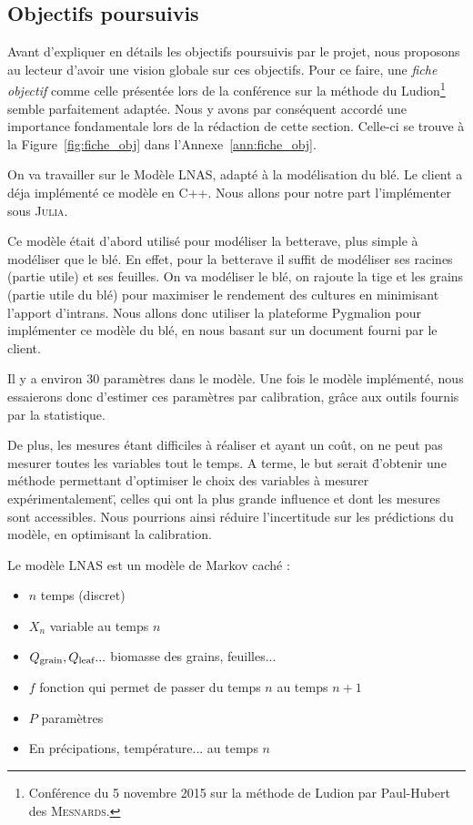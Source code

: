 \subsection{Objectifs poursuivis}
Avant d'expliquer en détails les objectifs poursuivis par le projet,
nous proposons au lecteur d'avoir une vision globale sur ces objectifs.
Pour ce faire, une \emph{fiche objectif} comme celle présentée 
lors de la conférence sur 
la méthode du Ludion\footnote{Conférence du 5 novembre 2015 
sur la méthode de Ludion par Paul-Hubert des \textsc{Mesnards}.} 
semble parfaitement adaptée.
Nous y avons par conséquent accordé une importance fondamentale
lors de la rédaction de cette section.
Celle-ci se trouve à la Figure~\ref{fig:fiche_obj} 
dans l'Annexe~\ref{ann:fiche_obj}.


On va travailler sur le Modèle LNAS, adapté à la modélisation du blé. 
Le client a déja implémenté ce modèle en C++. 
Nous allons pour notre part l'implémenter sous \textsc{Julia}.

Ce modèle était d'abord utilisé pour modéliser la betterave, 
plus simple à modéliser que le blé. 
En effet, pour la betterave il suffit de modéliser 
ses racines (partie utile) et ses feuilles.
On va modéliser le blé, on rajoute la tige et les grains (partie utile du blé)
pour maximiser le rendement des cultures en minimisant l’apport d’intrans.
Nous allons donc utiliser la plateforme Pygmalion 
pour implémenter ce modèle du blé,
en nous basant sur un document fourni par le client.

Il y a environ 30 paramètres dans le modèle. Une fois le modèle implémenté, nous essaierons donc d'estimer ces paramètres par calibration, grâce aux outils fournis par la statistique.

De plus, les mesures étant difficiles à réaliser et ayant un coût, on ne peut pas mesurer toutes les variables tout le temps. A terme, le but serait \"d'obtenir une méthode permettant d'optimiser le choix des variables à mesurer expérimentalement\", celles qui ont la plus grande influence et dont les mesures sont accessibles. Nous pourrions ainsi réduire l'incertitude sur les prédictions du modèle, en optimisant la calibration.

Le modèle LNAS est un modèle de Markov caché : 
\begin{itemize}
  \item $n$  temps (discret)     
  \item $X_n$ variable au temps $n$       
  \item $Q_{\text{grain}}, Q_{\text{leaf}}... $ biomasse des grains, feuilles...      
  \item $f$ fonction qui permet de passer du temps $n$ au temps $n+1$     
  \item $P$ paramètres      
  \item En précipations, température... au temps $n$
\end{itemize}

